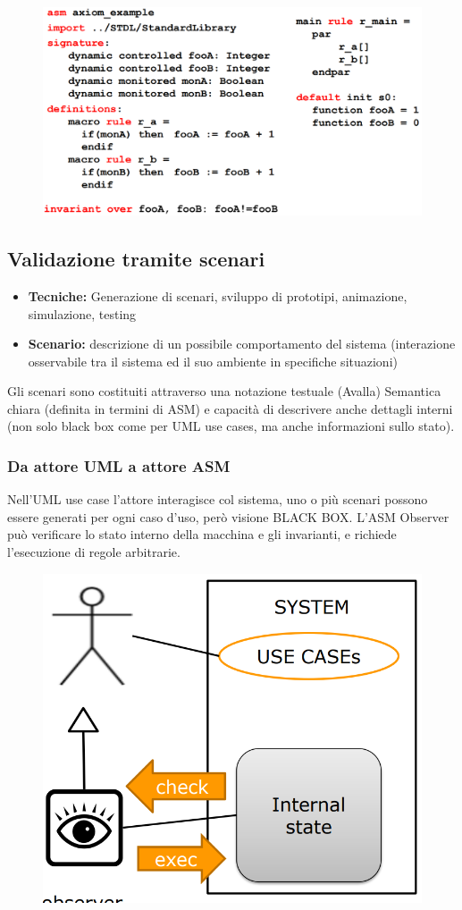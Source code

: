 \begin{figure}[H]
    \includegraphics[width=0.8\linewidth]{chapters/2/images/axiomex.png}
\end{figure}


\subsection{Validazione tramite scenari}
\begin{itemize}
    \item \textbf{Tecniche:} Generazione di scenari, sviluppo di prototipi, animazione, simulazione, testing 
    \item \textbf{Scenario:} descrizione di un possibile comportamento del sistema (interazione osservabile tra il sistema ed il suo
    ambiente in specifiche situazioni)
\end{itemize}

\noindent Gli scenari sono costituiti attraverso una notazione testuale (Avalla)
Semantica chiara (definita in termini di ASM) e capacità di descrivere anche dettagli interni (non solo black box come per UML use cases, ma
anche informazioni sullo stato).

\subsubsection{Da attore UML  a attore ASM}
\noindent Nell'UML use case l'attore interagisce col sistema, uno o più scenari possono essere generati per
ogni caso d'uso, però visione BLACK BOX.
\noindent L'ASM Observer può verificare lo stato interno della macchina e gli invarianti, e
richiede l'esecuzione di regole arbitrarie.

\begin{figure}[H]
    \includegraphics[width=0.5\linewidth]{chapters/2/images/attoreASM.png}
\end{figure}

